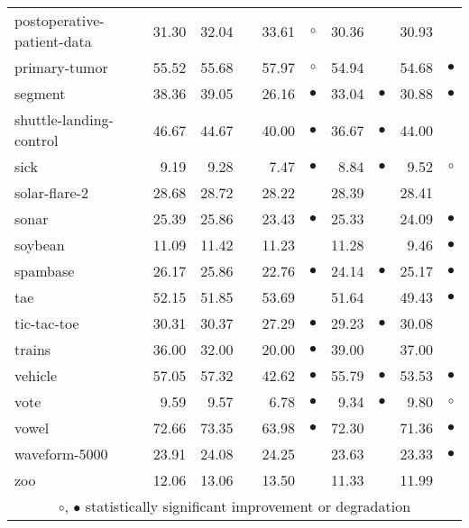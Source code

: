 \begin{table}[thb]
{\begin{tabular}{lrr@{\hspace{0.1cm}}cr@{\hspace{0.1cm}}cr@{\hspace{0.1cm}}cr@{\hspace{0.1cm}}c}
postoperative-patient-data & 31.30 & 32.04 &           & 33.61 &   $\circ$ & 30.36 &           & 30.93 &          \\
primary-tumor & 55.52 & 55.68 &           & 57.97 &   $\circ$ & 54.94 &           & 54.68 & $\bullet$\\
segment & 38.36 & 39.05 &           & 26.16 & $\bullet$ & 33.04 & $\bullet$ & 30.88 & $\bullet$\\
shuttle-landing-control & 46.67 & 44.67 &           & 40.00 & $\bullet$ & 36.67 & $\bullet$ & 44.00 &          \\
sick &  9.19 &  9.28 &           &  7.47 & $\bullet$ &  8.84 & $\bullet$ &  9.52 &   $\circ$\\
solar-flare-2 & 28.68 & 28.72 &           & 28.22 &           & 28.39 &           & 28.41 &          \\
sonar & 25.39 & 25.86 &           & 23.43 & $\bullet$ & 25.33 &           & 24.09 & $\bullet$\\
soybean & 11.09 & 11.42 &           & 11.23 &           & 11.28 &           &  9.46 & $\bullet$\\
spambase & 26.17 & 25.86 &           & 22.76 & $\bullet$ & 24.14 & $\bullet$ & 25.17 & $\bullet$\\
tae & 52.15 & 51.85 &           & 53.69 &           & 51.64 &           & 49.43 & $\bullet$\\
tic-tac-toe & 30.31 & 30.37 &           & 27.29 & $\bullet$ & 29.23 & $\bullet$ & 30.08 &          \\
trains & 36.00 & 32.00 &           & 20.00 & $\bullet$ & 39.00 &           & 37.00 &          \\
vehicle & 57.05 & 57.32 &           & 42.62 & $\bullet$ & 55.79 & $\bullet$ & 53.53 & $\bullet$\\
vote &  9.59 &  9.57 &           &  6.78 & $\bullet$ &  9.34 & $\bullet$ &  9.80 &   $\circ$\\
vowel & 72.66 & 73.35 &           & 63.98 & $\bullet$ & 72.30 &           & 71.36 & $\bullet$\\
waveform-5000 & 23.91 & 24.08 &           & 24.25 &           & 23.63 &           & 23.33 & $\bullet$\\
zoo & 12.06 & 13.06 &           & 13.50 &           & 11.33 &           & 11.99 &          \\
\hline
\multicolumn{10}{c}{$\circ$, $\bullet$ statistically significant improvement or degradation}\\
\end{tabular} \footnotesize \par}
\end{table}